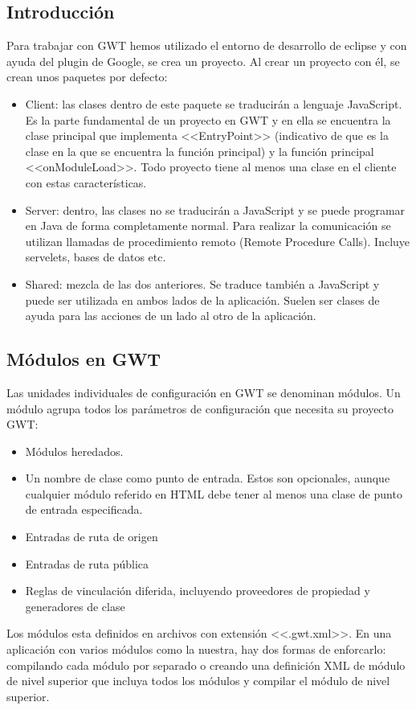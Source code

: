 \subsection{Introducción}
Para trabajar con GWT hemos utilizado el entorno de desarrollo de eclipse y con ayuda del plugin de Google, se crea un proyecto. Al crear un proyecto con él, se crean unos paquetes por defecto:
\begin{itemize}
\item Client: las clases dentro de este paquete se traducirán a lenguaje JavaScript. Es la parte fundamental de un proyecto en GWT y en ella se encuentra la clase principal que implementa <<EntryPoint>>  (indicativo de que es la clase en la que se encuentra la función principal) y la función principal <<onModuleLoad>>. Todo proyecto tiene al menos una clase en el cliente con estas características.
\item Server: dentro, las clases no se traducirán a JavaScript y se puede programar en Java de forma completamente normal. Para realizar la comunicación se utilizan llamadas de procedimiento remoto (Remote Procedure Calls). Incluye servelets, bases de datos etc.
\item Shared: mezcla de las dos anteriores. Se traduce también a JavaScript y puede ser utilizada en ambos lados de la aplicación. Suelen ser clases de ayuda para las acciones de un lado al otro de la aplicación.
\end{itemize}

\subsection{Módulos en GWT}

Las unidades individuales de configuración en GWT se denominan módulos. Un módulo agrupa todos los parámetros de configuración que necesita su proyecto GWT:

\begin{itemize}

\item Módulos heredados.
\item Un nombre de clase como punto de entrada. Estos son opcionales, aunque cualquier módulo referido en HTML debe tener al menos una clase de punto de entrada especificada.
\item Entradas de ruta de origen
\item Entradas de ruta pública
\item Reglas de vinculación diferida, incluyendo proveedores de propiedad y generadores de clase

\end{itemize}
Los módulos esta definidos en archivos con extensión <<.gwt.xml>>. En una aplicación con varios módulos como la nuestra, hay dos formas de enforcarlo: compilando cada módulo por separado o creando una definición XML de módulo de nivel superior que incluya todos los módulos y compilar el módulo de nivel superior.

